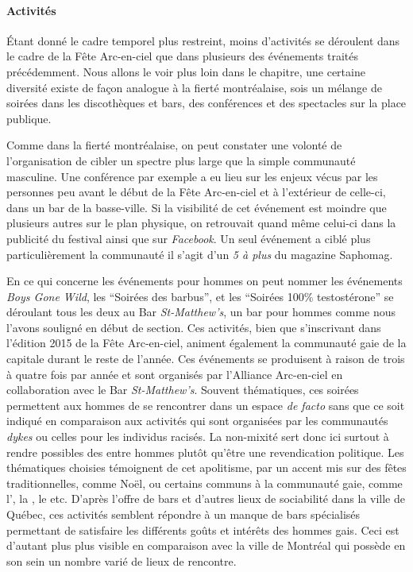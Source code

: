 \paragraph{Activités}
\label{subsec:activitesfetearcenciel}
Étant donné le cadre temporel plus restreint, moins d'activités se déroulent dans le cadre de la Fête Arc-en-ciel que dans plusieurs des événements traités précédemment.
Nous allons le voir plus loin dans le chapitre, une certaine diversité existe de façon analogue à la fierté montréalaise, sois un mélange de soirées dans les discothèques et bars, des conférences et des spectacles sur la place publique.

Comme dans la fierté montréalaise, on peut constater une volonté de l'organisation de cibler un spectre plus large que la simple communauté  masculine.
Une conférence par exemple a eu lieu sur les enjeux vécus par les personnes  peu avant le début de la Fête Arc-en-ciel et à l'extérieur de celle-ci, dans un bar de la basse-ville.
Si la visibilité de cet événement est moindre que plusieurs autres sur le plan physique, on retrouvait quand même celui-ci dans la publicité du festival ainsi que sur \emph{Facebook}.
Un seul événement a ciblé plus particulièrement la communauté  il s'agit d'un \emph{5 à plus} du magazine Saphomag.

En ce qui concerne les événements pour hommes  on peut nommer les événements \emph{Boys Gone Wild}, les \enquote{Soirées des barbus}, et les \enquote{Soirées 100\% testostérone} se déroulant tous les deux au Bar \emph{St-Matthew's}, un bar pour hommes comme nous l'avons souligné en début de section.
Ces activités, bien que s'inscrivant dans l'édition 2015 de la Fête Arc-en-ciel, animent également la communauté gaie de la capitale durant le reste de l'année.
Ces événements se produisent à raison de trois à quatre fois par année et sont organisés par l'Alliance Arc-en-ciel en collaboration avec le Bar \emph{St-Matthew's}.
Souvent thématiques, ces soirées permettent aux hommes de se rencontrer dans un espace \emph{de facto}  sans que ce soit indiqué en comparaison aux activités qui sont organisées par les communautés \emph{dykes} ou celles pour les individus racisés.
La non-mixité sert donc ici surtout à rendre possibles des  entre hommes plutôt qu'être une revendication politique.
Les thématiques choisies témoignent de cet apolitisme, par un accent mis sur des fêtes traditionnelles, comme Noël, ou certains  communs à la communauté gaie, comme l', la , le  etc.
D'après l'offre de bars et d'autres lieux de sociabilité dans la ville de Québec, ces activités semblent répondre à un manque de bars spécialisés permettant de satisfaire les différents goûts et intérêts des hommes gais.
Ceci est d'autant plus plus visible en comparaison avec la ville de Montréal qui possède en son sein un nombre varié de lieux de rencontre.

